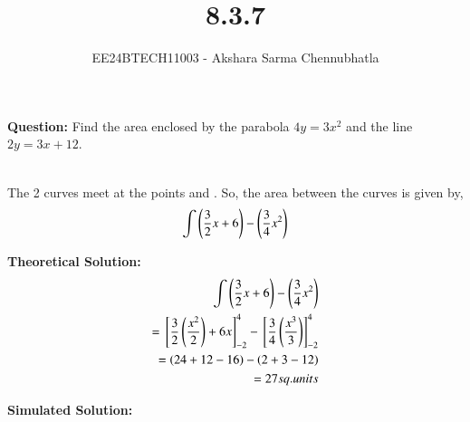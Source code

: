 \documentclass[journal]{IEEEtran}
\begin{document}

\vspace{3cm}

\title{8.3.7}
\author{EE24BTECH11003 - Akshara Sarma Chennubhatla}
{\let\newpage\relax\maketitle}
\textbf{Question:}
Find the area enclosed by the parabola $4y = 3x^2$ and the line $2y = 3x + 12$.

\solution\\
The 2 curves meet at the points  and . So, the area between the curves is given by,
\begin{align}
	\int{\ensuremath{\left(\frac{3}{2}x + 6\right)} - {\ensuremath{\left(\frac{3}{4}x^2\right)}}}
\end{align}

\textbf{Theoretical Solution:}\\

\begin{align}
	\int{\ensuremath{\left(\frac{3}{2}x + 6\right)} - {\ensuremath{\left(\frac{3}{4}x^2\right)}}}\\
	= {}\left[\frac{3}{2}\left(\frac{x^2}{2}\right) + 6x\right]_{-2}^{4} - {}\left[\frac{3}{4}\left(\frac{x^3}{3}\right)\right]_{-2}^{4}\\
	= \left(24 + 12 - 16\right) - \left(2 + 3 - 12\right)\\
	= 27 sq.units
\end{align}

\textbf{Simulated Solution:}\\
\end{document}
